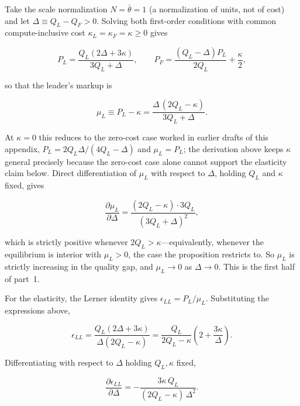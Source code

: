 \documentclass[11pt]{article}
\begin{document}
Take the scale normalization $N=\bar\theta=1$ (a normalization of units, not of cost) and let $\Delta\equiv Q_L-Q_F>0$. Solving both first-order conditions with common compute-inclusive cost $\kappa_L=\kappa_F=\kappa\geq0$ gives

\begin{equation}P_L=\frac{Q_L(2\Delta+3\kappa)}{3Q_L+\Delta},\qquad P_F=\frac{(Q_L-\Delta)P_L}{2Q_L}+\frac{\kappa}{2},\end{equation}

so that the leader's markup is

\begin{equation}\mu_L\equiv P_L-\kappa=\frac{\Delta\,(2Q_L-\kappa)}{3Q_L+\Delta}.\end{equation}

At $\kappa=0$ this reduces to the zero-cost case worked in earlier drafts of this appendix, $P_L=2Q_L\Delta/(4Q_L-\Delta)$ and $\mu_L=P_L$; the derivation above keeps $\kappa$ general precisely because the zero-cost case alone cannot support the elasticity claim below. Direct differentiation of $\mu_L$ with respect to $\Delta$, holding $Q_L$ and $\kappa$ fixed, gives

\begin{equation}\frac{\partial\mu_L}{\partial\Delta}=\frac{(2Q_L-\kappa)\cdot 3Q_L}{(3Q_L+\Delta)^{2}},\end{equation}

which is strictly positive whenever $2Q_L>\kappa$---equivalently, whenever the equilibrium is interior with $\mu_L>0$, the case the proposition restricts to. So $\mu_L$ is strictly increasing in the quality gap, and $\mu_L\to0$ as $\Delta\to0$. This is the first half of part~1.

For the elasticity, the Lerner identity gives $\epsilon_{LL}=P_L/\mu_L$. Substituting the expressions above,

\begin{equation}\epsilon_{LL}=\frac{Q_L(2\Delta+3\kappa)}{\Delta(2Q_L-\kappa)}=\frac{Q_L}{2Q_L-\kappa}\left(2+\frac{3\kappa}{\Delta}\right).\end{equation}

Differentiating with respect to $\Delta$ holding $Q_L,\kappa$ fixed,

\begin{equation}\frac{\partial\epsilon_{LL}}{\partial\Delta}=-\frac{3\kappa\,Q_L}{(2Q_L-\kappa)\,\Delta^{2}}.\end{equation}
\end{document}
